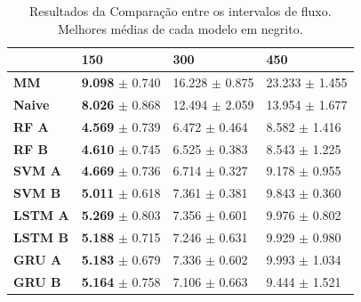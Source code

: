 \begin{table}[H]
    \begin{tabular*}{\linewidth}{@{\extracolsep{\fill}}llll}
    \toprule
     & 
    \multicolumn{1}{l}{\textbf{150}} & 
    \multicolumn{1}{l}{\textbf{300}} &
    \multicolumn{1}{l}{\textbf{450}} \\
    \midrule
    \textbf{MM} & \textbf{9.098} $\pm$ 0.740 & 16.228 $\pm$ 0.875 & 23.233 $\pm$ 1.455
    \\
    \midrule
    \textbf{Naive} & \textbf{8.026} $\pm$ 0.868 & 12.494 $\pm$ 2.059 & 13.954 $\pm$ 1.677
    \\
    \midrule
    \textbf{RF A} & \textbf{4.569} $\pm$ 0.739 & 6.472 $\pm$ 0.464 & 8.582 $\pm$ 1.416
    \\
    \midrule
    \textbf{RF B} & \textbf{4.610} $\pm$ 0.745 & 6.525 $\pm$ 0.383 & 8.543 $\pm$ 1.225
    \\
    \midrule
    \textbf{SVM A} & \textbf{4.669} $\pm$ 0.736 & 6.714 $\pm$ 0.327 & 9.178 $\pm$ 0.955
    \\
    \midrule
    \textbf{SVM B} & \textbf{5.011} $\pm$ 0.618 & 7.361 $\pm$ 0.381 & 9.843 $\pm$ 0.360
    \\
    \midrule
    \textbf{LSTM A} & \textbf{5.269} $\pm$ 0.803 & 7.356 $\pm$ 0.601 & 9.976 $\pm$ 0.802
    \\
    \midrule
    \textbf{LSTM B} & \textbf{5.188} $\pm$ 0.715 & 7.246 $\pm$ 0.631 & 9.929 $\pm$ 0.980
    \\
    \midrule
    \textbf{GRU A} & \textbf{5.183} $\pm$ 0.679 & 7.336 $\pm$ 0.602 & 9.993 $\pm$ 1.034
    \\
    \midrule
    \textbf{GRU B} & \textbf{5.164} $\pm$ 0.758 & 7.106 $\pm$ 0.663 & 9.444 $\pm$ 1.521
    \\
    \bottomrule
    \end{tabular*}
    \label{table:res_flow}
    \caption{Resultados da Comparação entre os intervalos de fluxo. Melhores médias de cada modelo em negrito.}
\end{table}


